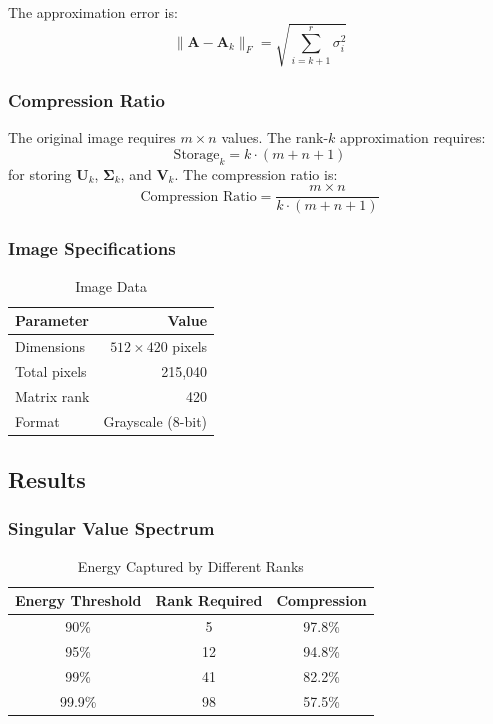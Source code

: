 \documentclass[12pt,a4paper]{article}
\begin{document}
The approximation error is:
\begin{equation}
    \|\mathbf{A} - \mathbf{A}_k\|_F = \sqrt{\sum_{i=k+1}^{r} \sigma_i^2}
\end{equation}

\subsubsection{Compression Ratio}

The original image requires $m \times n$ values. The rank-$k$ approximation requires:
\begin{equation}
    \text{Storage}_k = k \cdot (m + n + 1)
\end{equation}
for storing $\mathbf{U}_k$, $\boldsymbol{\Sigma}_k$, and $\mathbf{V}_k$. The compression ratio is:
\begin{equation}
    \text{Compression Ratio} = \frac{m \times n}{k \cdot (m + n + 1)}
\end{equation}

\subsubsection{Image Specifications}

\begin{table}[H]
\centering
\caption{Image Data}
\label{tab:image_data}
\begin{tabular}{@{}lr@{}}
\toprule
\textbf{Parameter} & \textbf{Value} \\
\midrule
Dimensions & $512 \times 420$ pixels \\
Total pixels & 215,040 \\
Matrix rank & 420 \\
Format & Grayscale (8-bit) \\
\bottomrule
\end{tabular}
\end{table}

\subsection{Results}

\subsubsection{Singular Value Spectrum}

\begin{table}[H]
\centering
\caption{Energy Captured by Different Ranks}
\label{tab:energy}
\begin{tabular}{@{}ccc@{}}
\toprule
\textbf{Energy Threshold} & \textbf{Rank Required} & \textbf{Compression} \\
\midrule
90\% & 5 & 97.8\% \\
95\% & 12 & 94.8\% \\
99\% & 41 & 82.2\% \\
99.9\% & 98 & 57.5\% \\
\bottomrule
\end{tabular}
\end{table}
\end{document}
